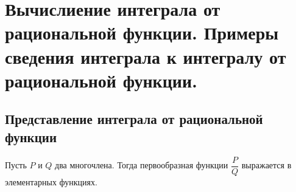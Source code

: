 \documentclass[a4paper]{article}
\theoremstyle{named}
\begin{document}
    \section{Вычислиение интеграла от рациональной функции. Примеры сведения интеграла к интегралу от рациональной функции.}

        \subsection{Представление интеграла от рациональной функции}

        \begin{theorem*}
            Пусть $P$ и $Q$ два многочлена. Тогда первообразная функции $\dfrac{P}{Q}$ выражается в элементарных функциях.
        \end{theorem*}
\end{document}
